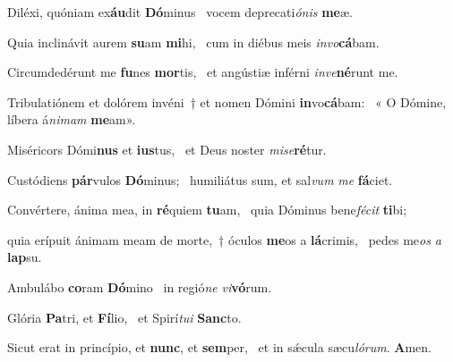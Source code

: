 \item Diléxi, quóniam ex\textbf{áu}dit \textbf{Dó}minus~\psstar{} vocem deprecati\textit{ónis} \textbf{me}æ.

\item Quia inclinávit aurem \textbf{su}am \textbf{mi}hi,~\psstar{} cum in diébus meis \textit{invo}\textbf{cá}bam.

\item Circumdedérunt me \textbf{fu}nes \textbf{mor}tis,~\psstar{} et angústiæ inférni \textit{inve}\textbf{né}runt me.

\item Tribulatiónem et dolórem invéni~† et nomen Dómini \textbf{in}vo\textbf{cá}bam:~\psstar{} « O Dómine, líbera á\textit{nimam} \textbf{me}am».

\item Miséricors Dómi\textbf{nus} et \textbf{ius}tus,~\psstar{} et Deus noster \textit{mise}\textbf{ré}tur.

\item Custódiens \textbf{pár}vulos \textbf{Dó}minus;~\psstar{} humiliátus sum, et sal\textit{vum} \textit{me} \textbf{fá}ciet.

\item Convértere, ánima mea, in \textbf{ré}quiem \textbf{tu}am,~\psstar{} quia Dóminus bene\textit{fécit} \textbf{ti}bi;

\item quia erípuit ánimam meam de morte,~† óculos \textbf{me}os a \textbf{lá}crimis,~\psstar{} pedes me\textit{os} \textit{a} \textbf{lap}su.

\item Ambulábo \textbf{co}ram \textbf{Dó}mino~\psstar{} in regió\textit{ne} \textit{vi}\textbf{vó}rum.

\item Glória \textbf{Pa}tri, et \textbf{Fí}lio,~\psstar{} et Spirí\textit{tui} \textbf{Sanc}to.

\item Sicut erat in princípio, et \textbf{nunc}, et \textbf{sem}per,~\psstar{} et in sǽcula sæcu\textit{lórum}. \textbf{A}men.